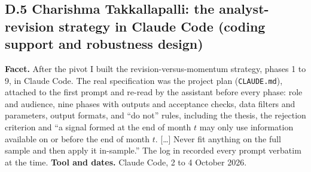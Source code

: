 \subsection*{D.5 Charishma Takkallapalli: the analyst-revision strategy in Claude Code (coding support and robustness design)}

\textbf{Facet.} After the pivot I built the revision-versus-momentum strategy, phases 1 to 9, in Claude Code. The real specification was the project plan (\texttt{CLAUDE.md}), attached to the first prompt and re-read by the assistant before every phase: role and audience, nine phases with outputs and acceptance checks, data filters and parameters, output formats, and ``do not'' rules, including the thesis, the rejection criterion and ``a signal formed at the end of month $t$ may only use information available on or before the end of month $t$. [\ldots] Never fit anything on the full sample and then apply it in-sample.'' The log in  recorded every prompt verbatim at the time. \textbf{Tool and dates.} Claude Code, 2 to 4 October 2026.

